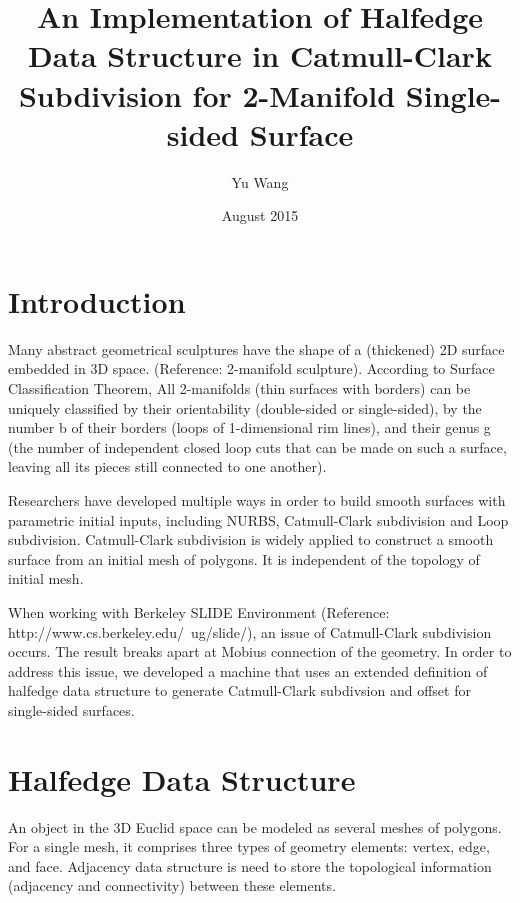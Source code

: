 \documentclass[12pt]{article}
\title{An Implementation of Halfedge Data Structure in Catmull-Clark 
Subdivision for 2-Manifold Single-sided Surface}
\author{Yu Wang}
\date{August 2015}
\begin{document}
\maketitle
\newpage

\tableofcontents
\newpage
\section{Introduction}
Many abstract geometrical sculptures have the shape of a (thickened) 2D surface embedded in 3D space. (Reference: 2-manifold sculpture). According to Surface Classification Theorem, All 2-manifolds (thin surfaces with borders) can be uniquely classified by their orientability (double-sided or single-sided), by the number b of their borders (loops of 1-dimensional rim lines), and their genus g (the number of independent closed loop cuts that can be made on such a surface, leaving all its pieces still connected to one another).

Researchers have developed multiple ways in order to build smooth surfaces with parametric initial inputs, including NURBS, Catmull-Clark subdivision and Loop subdivision. Catmull-Clark subdivision is widely applied to construct a smooth surface from an initial mesh of polygons. It is independent of the topology of initial mesh.

When working with Berkeley SLIDE Environment (Reference: http://www.cs.berkeley.edu/~ug/slide/), an issue of Catmull-Clark subdivision occurs. The result breaks apart at Mobius connection of the geometry. In order to address this issue, we developed a machine that uses an extended definition of halfedge data structure to generate Catmull-Clark subdivsion and offset for single-sided surfaces.



\newpage
\section{Halfedge Data Structure} \label{sec:halfedge}

An object in the 3D Euclid space can be modeled as several meshes of polygons. For a single mesh, it comprises three types of geometry elements: vertex, edge, and face. Adjacency data structure is need to store the topological information (adjacency and connectivity) between these elements.
\end{document}
